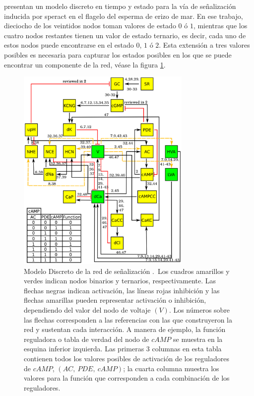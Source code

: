 \citeauthor{Espinal2011} \citep{Espinal2011} presentan un modelo discreto en tiempo y estado para la vía de señalización inducida por speract en el flagelo del esperma de erizo de mar. En ese trabajo, dieciocho de los veintidos nodos toman valores de estado $0$ ó $1$, mientras que los cuatro nodos restantes tienen un valor de estado ternario, es decir, cada uno de estos nodos puede encontrarse en el estado $0$, $1$ ó $2$. Esta extensión a tres valores posibles es necesaria para capturar los estados posibles en los que se puede encontrar un componente de la red, véase la figura \ref{fig:erizoModelo}.

\begin{figure}[hbt]
\includegraphics[width=0.9\linewidth,height=10cm]{gfx/redErizoModelo}
\caption[Modelo Discreto de la red de se\~nalizaci\'on]{Modelo Discreto de la red de se\~nalizaci\'on \citeauthor{Espinal2011} \citep{Espinal2011}.\ Los cuadros amarillos y verdes indican nodos binarios y ternarios, respectivamente. Las flechas negras indican activación, las líneas rojas inhibición y las flechas amarillas pueden representar activación o inhibición, dependiendo del valor del nodo de voltaje $(V)$. Los números sobre las flechas corresponden a las referencias con las que \citeauthor{Espinal2011} \citep{Espinal2011} construyeron la red y sustentan cada interacción. A manera de ejemplo, la función reguladora o tabla de verdad del nodo de $cAMP$ se muestra en la esquina inferior izquierda. Las primeras 3 columnas en esta tabla contienen todos los valores posibles de activación de los reguladores de $cAMP$, $(AC,\ PDE,\ cAMP)$; la cuarta columna muestra los valores para la función que corresponden a cada combinación de los reguladores.}\label{fig:erizoModelo}
\end{figure}

